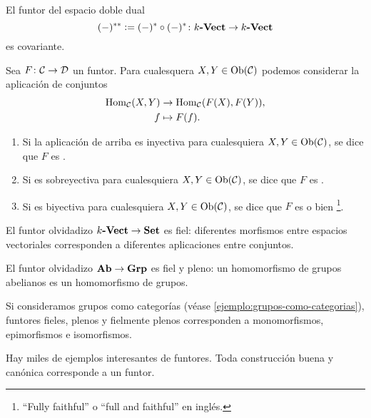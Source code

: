 \documentclass{article}
\numberwithin{equation}{section}
\theoremstyle{definition}
\begin{document}
\begin{ejemplo}
  El funtor del espacio doble dual
  $$(-)^{**} \mathrel{\mathop:}= (-)^*\circ (-)^* \colon k\text{\bf -Vect} \to k\text{\bf -Vect}$$
  es covariante.
\end{ejemplo}

\begin{definicion}
  Sea $F\colon \mathcal{C}\to\mathcal{D}$ un funtor. Para cualesquera
  $X,Y\in\operatorname{Ob}(\mathcal{C})$ podemos considerar la aplicación de conjuntos
  \begin{align*}
    \operatorname{Hom}_\mathcal{C} (X,Y) & \to \operatorname{Hom}_\mathcal{C} (F (X), F (Y)),\\
    f & \mapsto F (f).
  \end{align*}

  \begin{enumerate}
  \item[1)] Si la aplicación de arriba es inyectiva para cualesquiera
    $X,Y\in\operatorname{Ob}(\mathcal{C})$, se dice que $F$ es .

  \item[2)] Si es sobreyectiva para cualesquiera $X,Y\in\operatorname{Ob}(\mathcal{C})$, se
    dice que $F$ es .

  \item[3)] Si es biyectiva para cualesquiera $X,Y\in\operatorname{Ob}(\mathcal{C})$, se dice
    que $F$ es  o bien \footnote{``Fully faithful'' o ``full and faithful'' en inglés.}.
  \end{enumerate}
\end{definicion}

\begin{ejemplo}
  El funtor olvidadizo $k\text{\bf -Vect} \to \text{\bf Set}$ es fiel: diferentes
  morfismos entre espacios vectoriales corresponden a diferentes aplicaciones
  entre conjuntos.

  El funtor olvidadizo $\text{\bf Ab} \to \text{\bf Grp}$ es fiel y pleno: un
  homomorfismo de grupos abelianos es un homomorfismo de grupos.

  Si consideramos grupos como categorías (véase
  \ref{ejemplo:grupos-como-categorias}), funtores fieles, plenos y fielmente
  plenos corresponden a monomorfismos, epimorfismos e isomorfismos.
\end{ejemplo}

Hay miles de ejemplos interesantes de funtores. Toda construcción buena y
canónica corresponde a un funtor.

\end{document}
